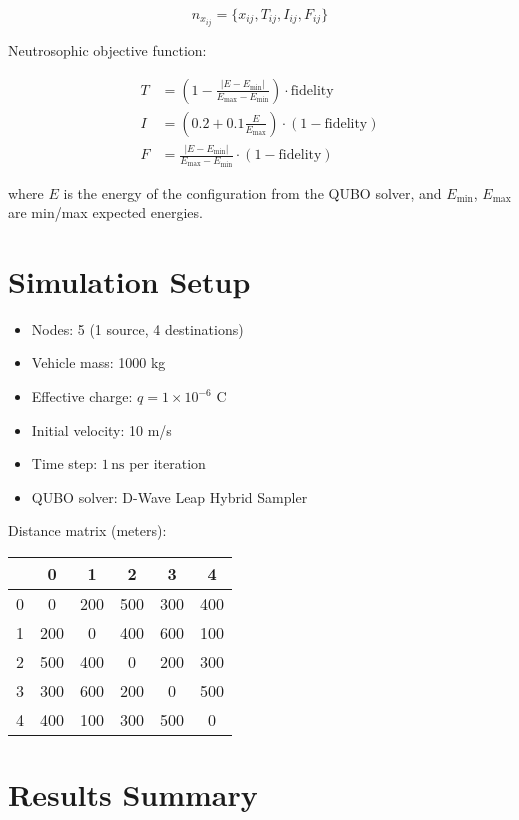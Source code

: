 \documentclass[12pt]{article}
\begin{document}
\[
n_{x_{ij}} = \{x_{ij}, T_{ij}, I_{ij}, F_{ij}\}
\]

Neutrosophic objective function:

\[
\begin{aligned}
T &= \left(1 - \frac{|E - E_\min|}{E_\max - E_\min}\right) \cdot \text{fidelity} \\
I &= \left(0.2 + 0.1 \frac{E}{E_\max}\right) \cdot (1 - \text{fidelity}) \\
F &= \frac{|E - E_\min|}{E_\max - E_\min} \cdot (1 - \text{fidelity})
\end{aligned}
\]

where $E$ is the energy of the configuration from the QUBO solver, and $E_\min$, $E_\max$ are min/max expected energies.

\section{Simulation Setup}
\begin{itemize}
    \item Nodes: 5 (1 source, 4 destinations)
    \item Vehicle mass: 1000 kg
    \item Effective charge: $q = 1 \times 10^{-6}$ C
    \item Initial velocity: 10 m/s
    \item Time step: $1\,\mathrm{ns}$ per iteration
    \item QUBO solver: D-Wave Leap Hybrid Sampler
\end{itemize}

Distance matrix (meters):

\begin{table}[h!]
\centering
\begin{tabular}{lccccc}
\toprule
 & 0 & 1 & 2 & 3 & 4 \\
\midrule
0 & 0 & 200 & 500 & 300 & 400 \\
1 & 200 & 0 & 400 & 600 & 100 \\
2 & 500 & 400 & 0 & 200 & 300 \\
3 & 300 & 600 & 200 & 0 & 500 \\
4 & 400 & 100 & 300 & 500 & 0 \\
\bottomrule
\end{tabular}
\end{table}

\section{Results Summary}
\end{document}
